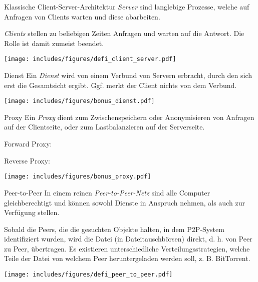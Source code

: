 \begin{defi}{Klassische Client-Server-Architektur}
    \emph{Server} sind langlebige Prozesse, welche auf Anfragen von Clients warten und diese abarbeiten.

    \emph{Clients} stellen zu beliebigen Zeiten Anfragen und warten auf die Antwort.
    Die Rolle ist damit zumeist beendet.

    \begin{center}
        \texttt{[image: includes/figures/defi\_client\_server.pdf]}
    \end{center}
\end{defi}

\begin{bonus}{Dienst}
    Ein \emph{Dienst} wird von einem Verbund von Servern erbracht, durch den sich erst die Gesamtsicht ergibt.
    Ggf. merkt der Client nichts von dem Verbund.

    \begin{center}
        \texttt{[image: includes/figures/bonus\_dienst.pdf]}
    \end{center}
\end{bonus}

\begin{bonus}{Proxy}
    Ein \emph{Proxy} dient zum Zwischenspeichern oder Anonymisieren von Anfragen auf der Clientseite, oder zum Lastbalanzieren auf der Serverseite.

    \begin{minipage}[t]{.5\textwidth}
        Forward Proxy:
    \end{minipage}%
    \begin{minipage}[t]{.5\textwidth}
        Reverse Proxy:
    \end{minipage}

    \texttt{[image: includes/figures/bonus\_proxy.pdf]}
\end{bonus}

\begin{defi}{Peer-to-Peer}
    In einem reinen \emph{Peer-to-Peer-Netz} sind alle Computer gleichberechtigt und können sowohl Dienste in Anspruch nehmen, als auch zur Verfügung stellen.

    Sobald die Peers, die die gesuchten Objekte halten, in dem P2P-System identifiziert wurden, wird die Datei (in Dateitauschbörsen) direkt, d. h. von Peer zu Peer, übertragen.
    Es existieren unterschiedliche Verteilungsstrategien, welche Teile der Datei von welchem Peer heruntergeladen werden soll, z. B. BitTorrent.

    \centering
    \texttt{[image: includes/figures/defi\_peer\_to\_peer.pdf]}
\end{defi}

